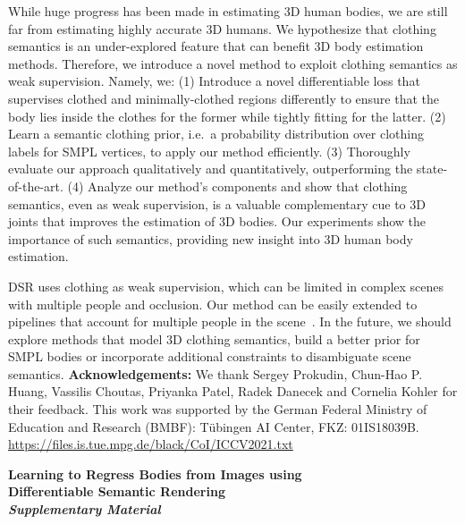 \documentclass[10pt,twocolumn,letterpaper]{article}
\newcommand{\modelname}[0]{DSR\xspace}
\begin{document}
While huge progress has been made in estimating 3D human bodies, we are still far from estimating highly accurate 3D humans. We hypothesize that clothing semantics is an under-explored feature that can benefit 3D body estimation methods. Therefore, we introduce a novel method to exploit clothing semantics as weak supervision. Namely, we: (1) Introduce a novel differentiable loss that supervises clothed and minimally-clothed regions differently to ensure that the body lies inside the clothes for the former while tightly fitting for the latter. (2) Learn a semantic clothing prior, i.e.~a probability distribution over clothing labels for SMPL vertices, to apply our method efficiently. (3) Thoroughly evaluate our approach qualitatively and quantitatively, outperforming the state-of-the-art. (4) Analyze our method's components and show that clothing semantics, even as weak supervision, is a valuable complementary cue to 3D joints that improves the estimation of 3D bodies. Our experiments show the importance of such semantics, providing new insight into 3D human body estimation.

{\modelname} uses clothing as weak supervision, which can be limited in complex scenes with multiple people and occlusion.  Our method can be easily extended to pipelines that account for multiple people in the scene~\cite{Zanfir2018Monocular3P}. In the future, we should explore methods that model 3D clothing semantics, build a better prior for SMPL bodies or incorporate additional constraints to disambiguate scene semantics.  
{\bf Acknowledgements:}
We thank Sergey Prokudin, Chun-Hao P. Huang, Vassilis Choutas, Priyanka Patel, Radek Danecek and Cornelia Kohler for their feedback. This work was supported by the German Federal Ministry of Education and Research (BMBF): Tübingen AI Center, FKZ: 01IS18039B. 
 \url{https://files.is.tue.mpg.de/black/CoI/ICCV2021.txt}
 
{\small


}

\newpage
\appendix
\setcounter{figure}{0} \renewcommand{\thefigure}{\Roman{table}}
\setcounter{table}{0} \renewcommand{\thetable}{\Roman{table}}
\begin{strip}\centering \Large
 \textbf{Learning to Regress Bodies from Images using \\ Differentiable Semantic Rendering\\
 \vspace{0.5cm} \textit{Supplementary Material} \vspace{0.5cm}
 }\\
\end{strip}
\end{document}
